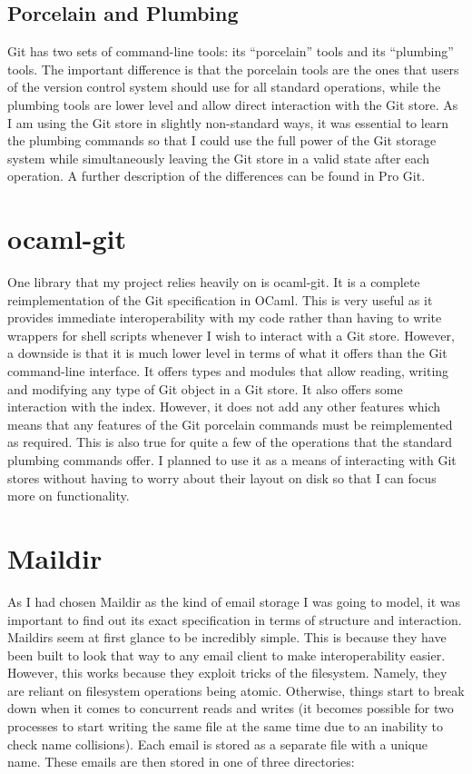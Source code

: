 \subsection{Porcelain and Plumbing}

Git has two sets of command-line tools: its ``porcelain'' tools and its ``plumbing'' tools. The important difference is that the porcelain tools are the ones that users of the version control system should use for all standard operations, while the plumbing tools are lower level and allow direct interaction with the Git store. As I am using the Git store in slightly non-standard ways, it was essential to learn the plumbing commands so that I could use the full power of the Git storage system while simultaneously leaving the Git store in a valid state after each operation. A further description of the differences can be found in Pro Git\cite{chacon2014git}.

\section{ocaml-git}

One library that my project relies heavily on is ocaml-git\cite{code_ocaml-git}. It is a complete reimplementation of the Git specification in OCaml. This is very useful as it provides immediate interoperability with my code rather than having to write wrappers for shell scripts whenever I wish to interact with a Git store. However, a downside is that it is much lower level in terms of what it offers than the Git command-line interface. It offers types and modules that allow reading, writing and modifying any type of Git object in a Git store. It also offers some interaction with the index. However, it does not add any other features which means that any features of the Git porcelain commands must be reimplemented as required. This is also true for quite a few of the operations that the standard plumbing commands offer. I planned to use it as a means of interacting with Git stores without having to worry about their layout on disk so that I can focus more on functionality.

\section{Maildir}

As I had chosen Maildir as the kind of email storage I was going to model, it was important to find out its exact specification in terms of structure and interaction. Maildirs seem at first glance to be incredibly simple. This is because they have been built to look that way to any email client to make interoperability easier. However, this works because they exploit tricks of the filesystem. Namely, they are reliant on filesystem operations being atomic. Otherwise, things start to break down when it comes to concurrent reads and writes (it becomes possible for two processes to start writing the same file at the same time due to an inability to check name collisions).
Each email is stored as a separate file with a unique name. These emails are then stored in one of three directories:

